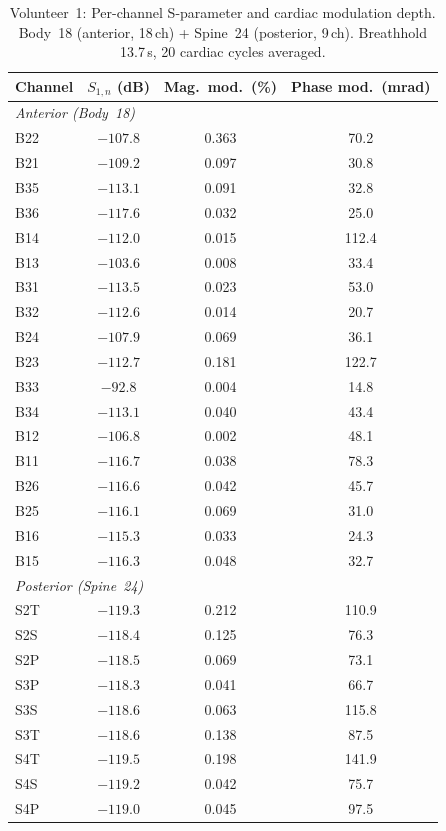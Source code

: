 \begin{table}[htbp]
\centering
\caption{Volunteer~1: Per-channel S-parameter and cardiac modulation depth. Body~18 (anterior, 18\,ch) + Spine~24 (posterior, 9\,ch). Breathhold 13.7\,s, 20 cardiac cycles averaged.}
\label{tab:exp-v1}
\small
\begin{tabular}{lccc}
\hline
Channel & $S_{1,n}$ (dB) & Mag.\ mod.\ (\%) & Phase mod.\ (mrad) \\
\hline
\multicolumn{4}{l}{\textit{Anterior (Body~18)}} \\
\hline
B22 & $-107.8$ & 0.363 & 70.2 \\
B21 & $-109.2$ & 0.097 & 30.8 \\
B35 & $-113.1$ & 0.091 & 32.8 \\
B36 & $-117.6$ & 0.032 & 25.0 \\
B14 & $-112.0$ & 0.015 & 112.4 \\
B13 & $-103.6$ & 0.008 & 33.4 \\
B31 & $-113.5$ & 0.023 & 53.0 \\
B32 & $-112.6$ & 0.014 & 20.7 \\
B24 & $-107.9$ & 0.069 & 36.1 \\
B23 & $-112.7$ & 0.181 & 122.7 \\
B33 & $-92.8$ & 0.004 & 14.8 \\
B34 & $-113.1$ & 0.040 & 43.4 \\
B12 & $-106.8$ & 0.002 & 48.1 \\
B11 & $-116.7$ & 0.038 & 78.3 \\
B26 & $-116.6$ & 0.042 & 45.7 \\
B25 & $-116.1$ & 0.069 & 31.0 \\
B16 & $-115.3$ & 0.033 & 24.3 \\
B15 & $-116.3$ & 0.048 & 32.7 \\
\hline
\multicolumn{4}{l}{\textit{Posterior (Spine~24)}} \\
\hline
S2T & $-119.3$ & 0.212 & 110.9 \\
S2S & $-118.4$ & 0.125 & 76.3 \\
S2P & $-118.5$ & 0.069 & 73.1 \\
S3P & $-118.3$ & 0.041 & 66.7 \\
S3S & $-118.6$ & 0.063 & 115.8 \\
S3T & $-118.6$ & 0.138 & 87.5 \\
S4T & $-119.5$ & 0.198 & 141.9 \\
S4S & $-119.2$ & 0.042 & 75.7 \\
S4P & $-119.0$ & 0.045 & 97.5 \\
\hline
\end{tabular}
\end{table}

